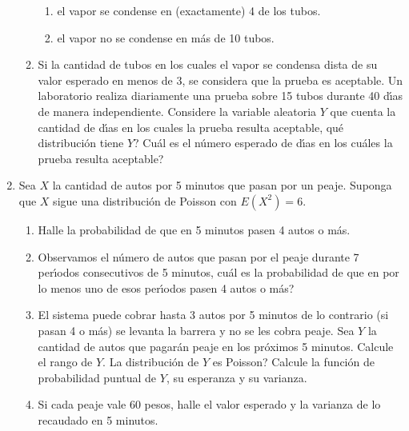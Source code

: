 \documentclass[11pt,a4paper,twoside]{article}%
\begin{document}
\begin{enumerate}
\begin{enumerate}
\begin{enumerate}
\item el vapor se condense en (exactamente) 4 de los tubos.

\item el vapor no se condense en m\'{a}s de 10 tubos.
\end{enumerate}

\item Si la cantidad de tubos en los cuales el vapor se condensa dista de su
valor esperado en menos de 3, se considera que la prueba es aceptable. Un
laboratorio realiza diariamente una prueba sobre 15 tubos durante 40 d\'{\i}as
de manera independiente. Considere la variable aleatoria $Y$ que cuenta la cantidad de d\'{\i}as en los cuales la prueba resulta aceptable,
\textquestiondown qu\'{e} distribuci\'{o}n tiene $Y$?
\textquestiondown Cu\'{a}l es el n\'{u}mero esperado de d\'{\i}as en los
cu\'{a}les la prueba resulta aceptable?
\end{enumerate}



\item Sea $X$ la cantidad de autos por 5 minutos que pasan por un peaje.
Suponga que $X$ sigue una distribuci\'{o}n de Poisson con $E(X^{2})=6$.

\begin{enumerate}
\item Halle la probabilidad de que en 5 minutos pasen 4 autos o m\'{a}s.

\item Observamos el n\'{u}mero de autos que pasan por el peaje durante 7
per\'{\i}odos consecutivos de 5 minutos, \textquestiondown cu\'{a}l es la
probabilidad de que en por lo menos uno de esos per\'{\i}odos pasen 4 autos o m\'{a}s?

\item El sistema puede cobrar hasta 3 autos por 5 minutos de lo contrario (si
pasan 4 o m\'{a}s) se levanta la barrera y no se les cobra peaje. Sea $Y$ la
cantidad de autos que pagar\'{a}n peaje en los pr\'{o}ximos 5 minutos.
Calcule el  rango de $Y$.
\textquestiondown La distribuci\'{o}n de $Y$ es Poisson? Calcule la
funci\'on de probabilidad puntual de $Y$, su esperanza y su varianza.

\item Si cada peaje vale 60 pesos, halle el valor esperado y la varianza de lo
recaudado en 5 minutos.
\end{enumerate}


\end{enumerate}
\end{document}
